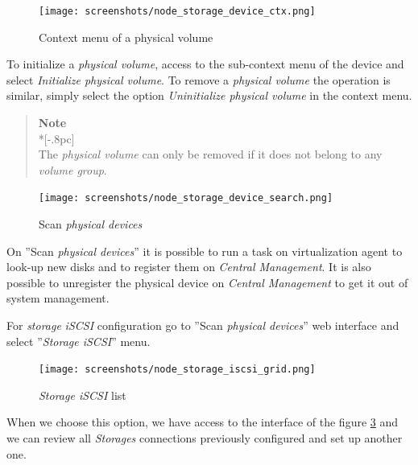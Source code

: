 \begin{figure}[H]
        \begin{center}
        \texttt{[image: screenshots/node\_storage\_device\_ctx.png]}
        \caption{Context menu of a physical volume}
        \label{fig:storage_device_ctx}
        \end{center}
\end{figure}

To initialize a \emph{physical volume}, access to the sub-context menu of the device and select \emph{Initialize physical volume}. To remove a \emph{physical volume} the operation is similar, simply select the option \emph{Uninitialize physical volume} in the context menu.

\begin{quote}
	{\large \bf Note} \\*[-.8pc]
	\underline{\hspace{6in}} \\
    The \emph{physical volume} can only be removed if it does not belong to any \emph{volume group}.
\end{quote}

\begin{figure}[H]
        \begin{center}
        \texttt{[image: screenshots/node\_storage\_device\_search.png]}
        \caption{Scan \emph{physical devices} }
        \label{fig:storage_device_search}
        \end{center}
\end{figure}

On ''Scan \emph{physical devices}'' it is possible to run a task on virtualization agent to look-up new disks and to register them on \emph{Central Management}. It is also possible to unregister the physical device on \emph{Central Management} to get it out of system management.

For \emph{storage} \emph{iSCSI} configuration go to ''Scan \emph{physical devices}'' web interface and select ''\emph{Storage iSCSI}'' menu.

\begin{figure}[H]
        \begin{center}
        \texttt{[image: screenshots/node\_storage\_iscsi\_grid.png]}
        \caption{\emph{Storage iSCSI} list}
        \label{fig:storage_iscsi_grid}
        \end{center}
\end{figure}

When we choose this option, we have access to the interface of the figure \ref{fig:storage_iscsi_grid} and we can review all \emph{Storages} connections previously configured and set up another one.

